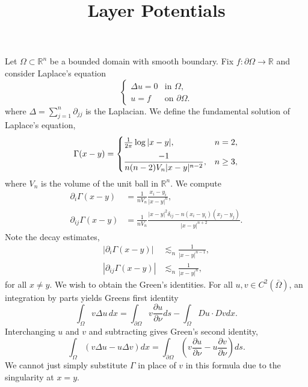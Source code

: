 \documentclass{article}
\title{Layer Potentials}
\newcommand{\R}{\mathbb{R}}
\begin{document}
\maketitle

Let $\Omega \subset \R^n$ be a bounded domain with smooth boundary.
Fix $f : \partial \Omega \to \R$ and consider Laplace's equation
\begin{equation}
\label{eq-laplace}
\begin{cases}
\Delta u = 0 & \text{in } \Omega, \\
u = f & \text{on } \partial \Omega.
\end{cases}
\end{equation}
where $\Delta = \sum_{j=1}^n \partial_{jj}$ is the Laplacian.
We define the fundamental solution of Laplace's equation,
\begin{equation}
\label{eq-fund_soln_laplace}
\Gamma(x-y)
= \begin{cases}
\frac{1}{2 \pi} \log|x-y|, & n = 2,  \vspace{2mm} \\
\displaystyle \frac{-1}{n(n-2)V_{n} |x-y|^{n-2}}, & n \ge 3,
\end{cases}
\end{equation}
where $V_n$ is the volume of the unit ball in $\R^n$.
We compute      %
\begin{align*}
\partial_i \Gamma(x-y) & = \frac{1}{n V_n} \frac{x_i - y_i}{|x-y|^n}, \\
\partial_{ij} \Gamma(x-y) & = \frac{1}{n V_n} \frac{|x-y|^2 \delta_{ij} - n (x_i - y_i)(x_j - y_j)}{|x-y|^{n+2}}.
\end{align*}
Note the decay estimates,
\begin{align*}
|\partial_i \Gamma(x-y)| & \lesssim_n \frac{1}{|x-y|^{n-1}}, \\
|\partial_{ij} \Gamma(x-y)| & \lesssim_n \frac{1}{|x-y|^{n}},
\end{align*}
for all $x \ne y$.
We wish to obtain the Green's identities.
For all $u,v \in C^2(\bar\Omega)$, an integration by parts yields Greens first identity
\[
\int_{\Omega} v \Delta u \, dx = \int_{\partial \Omega} v \frac{\partial u}{\partial \nu} ds - \int_{\Omega} Du \cdot Dv dx.
\]
Interchanging $u$ and $v$ and subtracting gives Green's second identity,
\[
\int_{\Omega} (v \Delta u - u \Delta v) dx = \int_{\partial \Omega} \left(v \frac{\partial u}{\partial \nu} - u \frac{\partial v}{\partial \nu}\right)ds.
\]
We cannot just simply substitute $\Gamma$ in place of $v$ in this formula due to the singularity at $x = y$.
\end{document}
